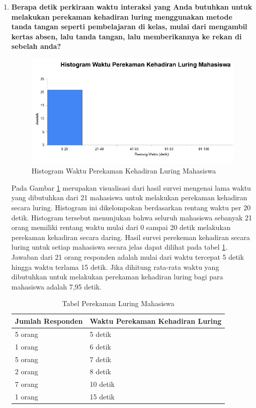\begin{enumerate}
	\item \textbf{Berapa detik perkiraan waktu interaksi yang Anda butuhkan untuk melakukan perekaman kehadiran luring menggunakan metode tanda tangan seperti pembelajaran di kelas, mulai dari mengambil kertas absen, lalu tanda tangan, lalu memberikannya ke rekan di sebelah anda?}
	\begin{figure}[H]
		\centering
		\includegraphics[scale=0.7]{Gambar/LuringMahasiswa.jpg}
		\caption{Histogram Waktu Perekaman Kehadiran Luring Mahasiswa} 
		\label{fig:LuringMahasiswa}
	\end{figure}
	Pada Gambar \ref{fig:LuringMahasiswa} merupakan visualisasi dari hasil survei mengenai lama waktu yang dibutuhkan dari 21 mahasiswa untuk melakukan perekaman kehadiran secara luring. Histogram ini dikelompokan berdasarkan rentang waktu per 20 detik. Histogram tersebut menunjukan bahwa seluruh mahasiswa sebanyak 21 orang memiliki rentang waktu mulai dari 0 sampai 20 detik melakukan perekaman kehadiran secara daring. Hasil survei perekeman kehadiran secara luring untuk setiap mahasiswa secara jelas dapat dilihat pada tabel \ref{tab:luringMahasiswa}. Jawaban dari 21 orang responden adalah mulai dari waktu tercepat 5 detik hingga waktu terlama 15 detik. Jika dihitung rata-rata waktu yang dibutuhkan untuk melakukan perekaman kehadiran luring bagi para mahasiswa adalah 7,95 detik. 
	\newpage
	\begin{table}[ht]			
		\caption{Tabel Perekaman Luring Mahasiswa}
		\centering
		\begin{tabular}{|p{4cm} |p{7cm}|}\hline
			Jumlah Responden &  Waktu Perekaman Kehadiran Luring \\ \hline     
			5 orang &  5 detik\\ \hline 
			1 orang &  6 detik\\ \hline 
			5 orang &  7 detik\\ \hline 
			2 orang &  8 detik\\ \hline 
			7 orang &  10 detik\\ \hline 
			1 orang &  15 detik\\ \hline
		\end{tabular}
		\label{tab:luringMahasiswa}
	\end{table}

\end{enumerate}
